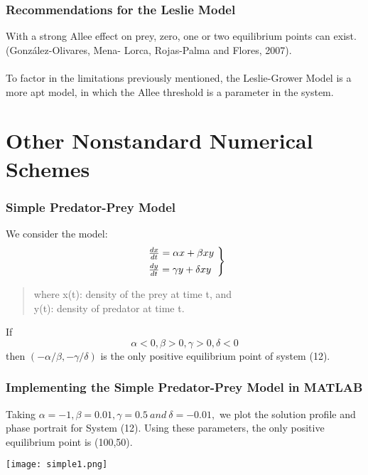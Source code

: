 \documentclass[xcolor={svgnames},hyperref={colorlinks,allcolors=Blue}]{beamer}
\begin{document}
\begin{frame}
\frametitle{Recommendations for the Leslie Model}

With a strong Allee effect on prey, zero, one or two equilibrium points can exist. (González-Olivares, Mena-			Lorca, Rojas-Palma and Flores, 2007). \pause \\~\\ 
To factor in the limitations previously mentioned, the Leslie-Grower Model is a more apt model, in which the Allee threshold is a parameter in the system. 

\end{frame}



\section{Other Nonstandard Numerical Schemes}

\begin{frame}
\frametitle{Simple Predator-Prey Model}
We consider the model:
\pause
	\begin{equation}
		\begin{rcases}
		~\frac{dx}{dt} = \alpha x +\beta xy~\\
		~\frac{dy}{dt} = \gamma y + \delta xy~
		\end{rcases}
	\end{equation}
	
	\begin{quote}
	where x(t): density of the prey at time t, and \\ y(t): density of predator at time t. 
	\end{quote}

\pause	
If \begin{equation} \alpha < 0, \beta >0, \gamma > 0, \delta < 0 \end{equation} then $(-\alpha/\beta, -\gamma/\delta)$ is the only positive equilibrium point of system (12).

\end{frame}

\begin{frame}
\frametitle{Implementing the Simple Predator-Prey Model in MATLAB}

Taking $\alpha = -1, \beta = 0.01, \gamma = 0.5 ~and~ \delta = -0.01,$ we plot the solution profile and phase portrait for System (12). Using these parameters, the only positive equilibrium point is (100,50). 

	\begin{center}
	\pause
		\texttt{[image: simple1.png]}
	\end{center}

\end{frame}
\end{document}
